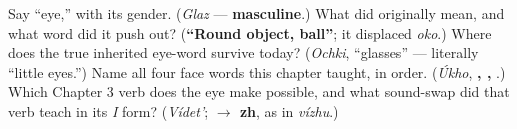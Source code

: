 \begin{tcolorbox}[breakable,colback=teal!4,colframe=teal!35!black,title={Before you move on}]
Say \textquotedblleft{}eye,\textquotedblright{} with its gender. (\emph{Glaz} — \textbf{masculine}.) What did \emph{} originally mean, and what word did it push out? (\textbf{\textquotedblleft{}Round object, ball\textquotedblright{}}; it displaced \emph{oko}.) Where does the true inherited eye-word survive today? (\emph{Ochki}, \textquotedblleft{}glasses\textquotedblright{} — literally \textquotedblleft{}little eyes.\textquotedblright{}) Name all four face words this chapter taught, in order. (\emph{Úkho}, \textbf{, , }.) Which Chapter 3 verb does the eye make possible, and what sound-swap did that verb teach in its \emph{I} form? (\emph{Vídet'}; \textbf{ $\to$ zh}, as in \emph{vízhu}.)
\end{tcolorbox}
